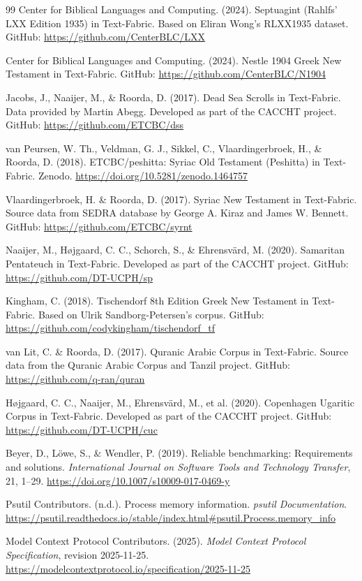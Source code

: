 \documentclass[11pt,a4paper]{article}
\begin{document}
\begin{thebibliography}{99}
Center for Biblical Languages and Computing. (2024). Septuagint (Rahlfs' LXX Edition 1935) in Text-Fabric. Based on Eliran Wong's RLXX1935 dataset. GitHub: \url{https://github.com/CenterBLC/LXX}

Center for Biblical Languages and Computing. (2024). Nestle 1904 Greek New Testament in Text-Fabric. GitHub: \url{https://github.com/CenterBLC/N1904}

Jacobs, J., Naaijer, M., \& Roorda, D. (2017). Dead Sea Scrolls in Text-Fabric. Data provided by Martin Abegg. Developed as part of the CACCHT project. GitHub: \url{https://github.com/ETCBC/dss}

van Peursen, W. Th., Veldman, G. J., Sikkel, C., Vlaardingerbroek, H., \& Roorda, D. (2018). ETCBC/peshitta: Syriac Old Testament (Peshitta) in Text-Fabric. Zenodo. \url{https://doi.org/10.5281/zenodo.1464757}

Vlaardingerbroek, H. \& Roorda, D. (2017). Syriac New Testament in Text-Fabric. Source data from SEDRA database by George A. Kiraz and James W. Bennett. GitHub: \url{https://github.com/ETCBC/syrnt}

Naaijer, M., Højgaard, C. C., Schorch, S., \& Ehrensv{\"a}rd, M. (2020). Samaritan Pentateuch in Text-Fabric. Developed as part of the CACCHT project. GitHub: \url{https://github.com/DT-UCPH/sp}

Kingham, C. (2018). Tischendorf 8th Edition Greek New Testament in Text-Fabric. Based on Ulrik Sandborg-Petersen's corpus. GitHub: \url{https://github.com/codykingham/tischendorf_tf}

van Lit, C. \& Roorda, D. (2017). Quranic Arabic Corpus in Text-Fabric. Source data from the Quranic Arabic Corpus and Tanzil project. GitHub: \url{https://github.com/q-ran/quran}

Højgaard, C. C., Naaijer, M., Ehrensv{\"a}rd, M., et al. (2020). Copenhagen Ugaritic Corpus in Text-Fabric. Developed as part of the CACCHT project. GitHub: \url{https://github.com/DT-UCPH/cuc}

Beyer, D., L{\"o}we, S., \& Wendler, P. (2019). Reliable benchmarking: Requirements and solutions. \textit{International Journal on Software Tools and Technology Transfer}, 21, 1--29. \url{https://doi.org/10.1007/s10009-017-0469-y}

Psutil Contributors. (n.d.). Process memory information. \textit{psutil Documentation}. \url{https://psutil.readthedocs.io/stable/index.html#psutil.Process.memory_info}

Model Context Protocol Contributors. (2025). \textit{Model Context Protocol Specification}, revision 2025-11-25. \url{https://modelcontextprotocol.io/specification/2025-11-25}

\end{thebibliography}
\end{document}
